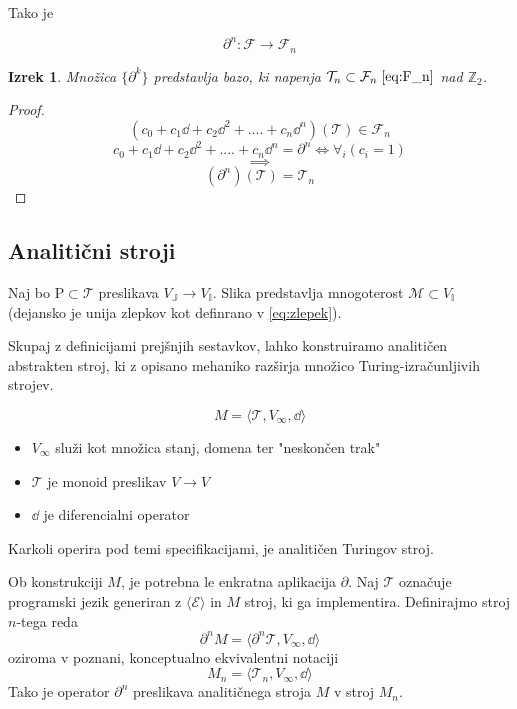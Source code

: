 \documentclass{article}
\newcommand{\II}{\mathbb{I}}
\newcommand{\JJ}{\mathbb{J}}
\newcommand{\E}{\mathcal{E}}
\newcommand{\T}{\mathcal{T}}
\newcommand{\F}{\mathcal{F}}
\newcommand{\D}{\partial}
\newtheorem{izrek}{Izrek}[section]
\begin{document}
  Tako je
  
   \begin{equation}
   	\D^n:\F\to\F_{n}
   \end{equation}
   
\begin{izrek}
  Množica $\{\partial^k\}$ predstavlja bazo, ki napenja $\T_n\subset\F_n\phantom{.}\eqref{eq:F_n}$ nad $\mathbb{Z}_2$.
 \end{izrek}
 
 \begin{proof} 
 	$$(c_0+c_1\dd+c_2\dd^2+....+c_n\dd^n)(\T)\in\F_n$$
 	$$c_0+c_1\dd+c_2\dd^2+....+c_n\dd^n=\D^n\iff \forall_i(c_i=1)$$
 	$$\implies$$
 	$$(\D^n)(\T)=\T_n$$
 	
  \end{proof}
  

\subsection{Analitični stroji}
   
Naj bo $\mathrm{P}\subset\T$ preslikava $V_\JJ\to V_\II$. Slika predstavlja
mnogoterost $\mathcal{M}\subset V_\II$ (dejansko je unija zlepkov kot definrano
v \ref{eq:zlepek}).

  
  Skupaj z definicijami prejšnjih sestavkov, lahko konstruiramo analitičen abstrakten stroj, ki z opisano mehaniko razširja množico Turing-izračunljivih strojev.
  
  \begin{equation}\label{eq:dTuring}
  M=\langle\T, V_\infty, \dd\rangle
  \end{equation}

 \begin{itemize}
 \item
 $V_\infty$ služi kot množica stanj, domena ter "neskončen trak"
 \item
 $\T$ je monoid preslikav $V\to V$
 \item
 $\dd$ je diferencialni operator
 \end{itemize}
 
 Karkoli operira pod temi specifikacijami, je analitičen Turingov stroj.
 
 Ob konstrukciji $M$, je potrebna le enkratna aplikacija $\D$. Naj $\T$ označuje programski jezik generiran z $\langle\E\rangle$ in $M$ stroj, ki ga implementira. Definirajmo stroj $n$-tega reda
 \begin{equation}\label{eq:Mprime}
	 \D^n M=\langle\D^n\T, V_\infty, \dd\rangle
 \end{equation}
 oziroma v poznani, konceptualno ekvivalentni notaciji
  \begin{equation}\label{eq:M'}
 	 M_n=\langle\T_n, V_\infty, \dd\rangle
  \end{equation}
  Tako je operator $\D^n$ preslikava analitičnega stroja $M$ v stroj $M_n$.
  
\end{document}
